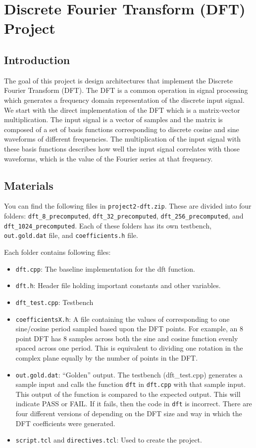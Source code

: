 \chapter{Discrete Fourier Transform (DFT) Project}
\glsresetall
\label{chapter:DFT_project}

\section{Introduction}
The goal of this project is design architectures that implement the Discrete Fourier Transform (DFT).  The DFT is a common operation in signal processing which generates a frequency domain representation of the discrete input signal. We start with the direct implementation of the DFT which is a matrix-vector multiplication. The input signal is a vector of samples and the matrix is composed of a set of basis functions corresponding to discrete cosine and sine waveforms of different frequencies. The multiplication of the input signal with these basis functions describes how well the input signal correlates with those waveforms, which is the value of the Fourier series at that frequency.

\section{Materials}
You can find the following files in \texttt{project2-dft.zip}. These are divided into four folders: \texttt{dft\_8\_precomputed}, \texttt{dft\_32\_precomputed}, \texttt{dft\_256\_precomputed}, and \texttt{dft\_1024\_precomputed}. Each of these folders has its own testbench, \texttt{out.gold.dat} file, and \texttt{coefficients.h} file. 

Each folder contains following files:
\begin{itemize}
\item \texttt{dft.cpp}: The baseline implementation for the dft function.
\item \texttt{dft.h}: Header file holding important constants and other variables.
\item \texttt{dft\_test.cpp}: Testbench
\item \texttt{coefficientsX.h}: A file containing the values of corresponding to one sine/cosine period sampled based upon the DFT points. For example, an 8 point DFT has 8 samples across both the sine and cosine function evenly spaced across one period. This is equivalent to dividing one rotation in the complex plane equally by the number of points in the DFT. 
\item \texttt{out.gold.dat}: ``Golden'' output. The testbench (dft\_test.cpp) generates a sample input and calls the function \texttt{dft} in \texttt{dft.cpp} with that sample input. This output of the function is compared to the expected output. This will indicate PASS or FAIL. If it fails, then the code in \texttt{dft} is incorrect. There are four different versions of depending on the DFT size and way in which the DFT coefficients were generated.
\item \texttt{script.tcl} and \texttt{directives.tcl}: Used to create the project. 
\end{itemize}


